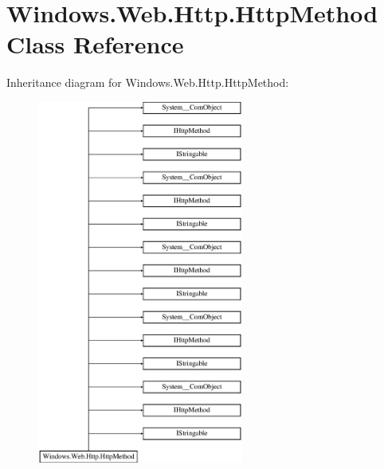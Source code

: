 \hypertarget{class_windows_1_1_web_1_1_http_1_1_http_method}{}\section{Windows.\+Web.\+Http.\+Http\+Method Class Reference}
\label{class_windows_1_1_web_1_1_http_1_1_http_method}
Inheritance diagram for Windows.\+Web.\+Http.\+Http\+Method\+:\begin{figure}[H]
\begin{center}
\leavevmode
\includegraphics[height=12.000000cm]{class_windows_1_1_web_1_1_http_1_1_http_method}
\end{center}
\end{figure}
